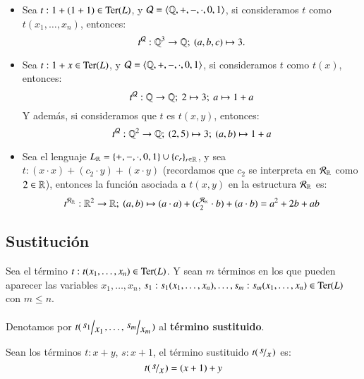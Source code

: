\begin{eg}
    \begin{itemize}
        \item Sea $t: 1 + (1 + 1) \in \mathrm{Ter}(L)$, y $\mathcal{Q} = \langle\mathbb{Q}, +, -, \cdot, 0, 1\rangle$, si consideramos $t$ como $t(x_1, \ldots, x_n)$, entonces:
        $$
            t^{\mathcal{Q}}: \mathbb{Q}^3 \to \mathbb{Q};\ (a, b, c) \mapsto 3.
        $$
        \item Sea $t: 1 + x \in \mathrm{Ter}(L)$, y $\mathcal{Q} = \langle\mathbb{Q}, +, -, \cdot, 0, 1\rangle$, si consideramos $t$ como $t(x)$, entonces:
        $$
            t^{\mathcal{Q}}: \mathbb{Q} \to \mathbb{Q};\ 2 \mapsto 3;\ a \mapsto 1 + a
        $$
        Y además, si consideramos que $t$ es $t(x, y)$, entonces:
        $$
            t^{\mathcal{Q}}: \mathbb{Q}^2 \to \mathbb{Q};\ (2, 5) \mapsto 3;\ (a, b) \mapsto 1 + a
        $$
        \item Sea el lenguaje $L_{\mathbb{R}} = \left\{+, -, \cdot, 0, 1\right\} \cup \left\{c_r\right\}_{r\in \mathbb{R}}$, y sea $t: (x \cdot x) + (c_2 \cdot y) + (x \cdot y)$ (recordamos que $c_2$ se interpreta en $\mathcal{R}_{\mathbb{R}}$ como $2 \in \mathbb{R}$), entonces la función asociada a $t(x, y)$ en la estructura $\mathcal{R}_{\mathbb{R}}$ es:
        $$
            t^{\mathcal{R}_{\mathbb{R}}}: \mathbb{R}^2 \to \mathbb{R};\ (a, b) \mapsto (a \cdot a) + (c_2^{\mathcal{R}_{\mathbb{R}}} \cdot b) + (a \cdot b) = a^2 + 2b + ab
        $$
    \end{itemize}
\end{eg}

\subsection{Sustitución}

\begin{dfn}
Sea el término $t: t(x_1, \ldots, x_n) \in \mathrm{Ter}(L)$. Y sean $m$ términos en los que pueden aparecer las variables $x_1, \ldots, x_n$, $s_1: s_1(x_1, \ldots, x_n), \ldots, s_m: s_m(x_1, \ldots, x_n) \in \mathrm{Ter}(L)$ con $m \leq n$.\\\\
Denotamos por $t(\quo{s_1}{x_1}, \ldots, \quo{s_m}{x_m})$ al \textbf{término sustituido}.
\end{dfn}

\begin{eg}
    Sean los términos $t: x + y$, $s: x + 1$, el término sustituido $t(\quo{s}{x})$ es:
    $$
        t(\quo{s}{x}) = (x + 1) + y
    $$
\end{eg}

